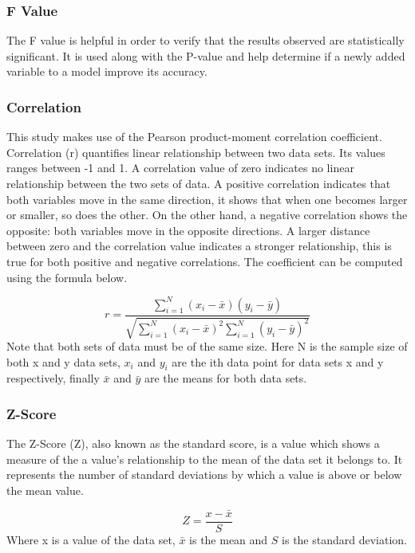 \subsubsection{F Value}

The F value is helpful in order to verify that the results observed are statistically significant. It is used along with the P-value and help determine if a newly added variable to a model improve its accuracy.

\subsubsection{Correlation}

This study makes use of the Pearson product-moment correlation coefficient. Correlation (r) quantifies linear relationship between two data sets. Its values ranges between -1 and 1. A correlation value of zero indicates no linear relationship between the two sets of data. A positive correlation indicates that both variables move in the same direction, it shows that when one becomes larger or smaller, so does the other. On the other hand, a negative correlation shows the opposite: both variables move in the opposite directions. 
A larger distance between zero and the correlation value indicates a stronger relationship, this is true for both positive and negative correlations. The coefficient can be computed using the formula below.

\begin{equation}
    r = \frac{\sum_{i=1}^{N}(x_{i} - \bar{x})(y_{i} - \bar{y})}{\sqrt{\sum_{i=1}^{N}(x_{i} - \bar{x})^{2}\sum_{i=1}^{N}(y_{i} - \bar{y})^{2}}}
\end{equation}
Note that both sets of data must be of the same size. Here N is the sample size of both x and y data sets, $x_{i}$ and $y_{i}$ are the ith data point for data sets x and y respectively, finally $\bar{x}$ and $\bar{y}$ are the means for both data sets.

\subsubsection{Z-Score}

The Z-Score (Z), also known as the standard score, is a value which shows a measure of the a value's relationship to the mean of the data set it belongs to. It represents the number of standard deviations by which a value is above or below the mean value.

\begin{equation}
    Z = \frac{x - \bar{x}}{S}
\end{equation}
Where x is a value of the data set, $\bar{x}$ is the mean and $S$ is the standard deviation.


